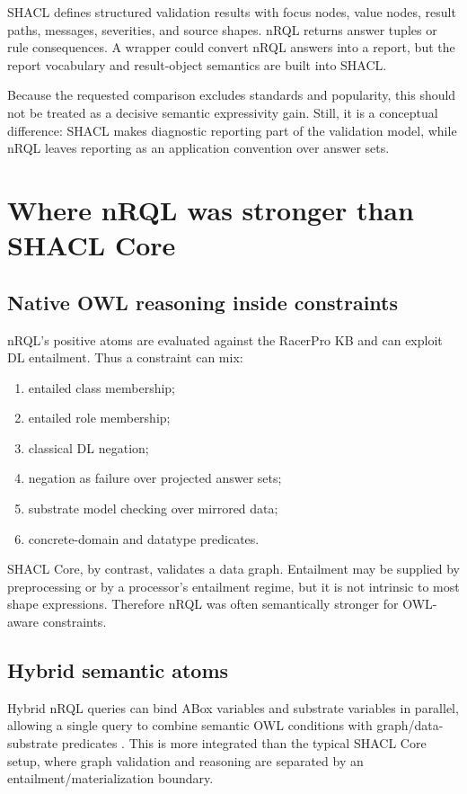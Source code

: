 \documentclass[11pt,letterpaper]{article}
\newcommand{\nrql}{nRQL}
\newcommand{\racer}{RacerPro}
\newcommand{\shacl}{SHACL}
\newcommand{\naf}{negation as failure}
\newcommand{\abox}{ABox}
\newcommand{\owl}{OWL}
\begin{document}
\shacl{} defines structured validation results with focus nodes, value nodes, result paths, messages, severities, and source shapes. \nrql{} returns answer tuples or rule consequences. A wrapper could convert \nrql{} answers into a report, but the report vocabulary and result-object semantics are built into \shacl{}.

Because the requested comparison excludes standards and popularity, this should not be treated as a decisive semantic expressivity gain. Still, it is a conceptual difference: \shacl{} makes diagnostic reporting part of the validation model, while \nrql{} leaves reporting as an application convention over answer sets.

\section{Where nRQL was stronger than SHACL Core}

\subsection{Native OWL reasoning inside constraints}

\nrql{}'s positive atoms are evaluated against the \racer{} KB and can exploit DL entailment. Thus a constraint can mix:

\begin{enumerate}[leftmargin=2em]
  \item entailed class membership;
  \item entailed role membership;
  \item classical DL negation;
  \item \naf{} over projected answer sets;
  \item substrate model checking over mirrored data;
  \item concrete-domain and datatype predicates.
\end{enumerate}

\shacl{} Core, by contrast, validates a data graph. Entailment may be supplied by preprocessing or by a processor's entailment regime, but it is not intrinsic to most shape expressions. Therefore \nrql{} was often semantically stronger for \owl{}-aware constraints.

\subsection{Hybrid semantic atoms}

Hybrid \nrql{} queries can bind \abox{} variables and substrate variables in parallel, allowing a single query to combine semantic \owl{} conditions with graph/data-substrate predicates \cite[pp.~135--137]{racerug}. This is more integrated than the typical \shacl{} Core setup, where graph validation and reasoning are separated by an entailment/materialization boundary.
\end{document}
